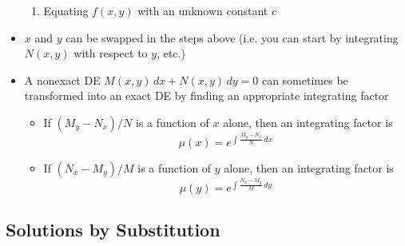 \documentclass{article}
\begin{document}
\begin{itemize}
\begin{enumerate}
          \item Equating $f(x, y)$ with an unknown constant $c$
        \end{enumerate}

  \item $x$ and $y$ can be swapped in the steps above (i.e. you can start by integrating $N(x, y)$ with respect to $y$, etc.)

  \item A nonexact DE $M(x, y) \,d x + N(x, y) \,d y = 0$ can sometimes be transformed into an exact DE by finding an appropriate integrating factor

        \begin{itemize}
          \item If $(M_y - N_x) / N$ is a function of $x$ alone, then an integrating factor is \[\mu(x) = e^{\int \frac{M_y - N_x}{N} \,d x}\]

          \item If $(N_x - M_y) / M$ is a function of $y$ alone, then an integrating factor is \[\mu(y) = e^{\int \frac{N_x - M_y}{M} \,d y}\]
        \end{itemize}
\end{itemize}

\subsection{Solutions by Substitution}
\end{document}
